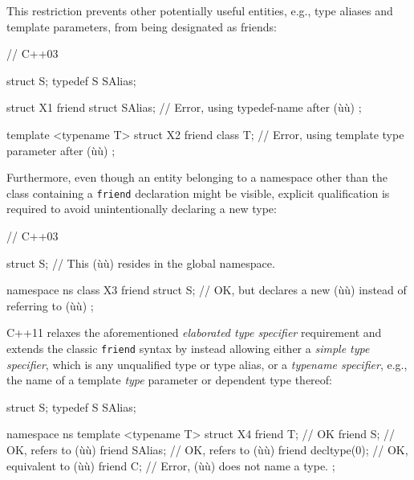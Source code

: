 \noindent This restriction prevents other potentially useful entities, e.g., type
aliases and template parameters, from being designated as friends:

\begin{emcppslisting}
// C++03

struct S;
typedef S SAlias;

struct X1
{
    friend struct SAlias;  // Error, using typedef-name after (ù{}ù)
};

template <typename T>
struct X2
{
    friend class T;        // Error, using template type parameter after (ù{}ù)
};
\end{emcppslisting}
    
\noindent Furthermore, even though an entity belonging to a namespace other than
the class containing a \lstinline!friend! declaration might be visible,
explicit qualification is required to avoid unintentionally declaring a new type:

\begin{emcppslisting}
// C++03

struct S;  // This (ù{}ù) resides in the global namespace.

namespace ns
{
    class X3
    {
        friend struct S;
            // OK, but declares a new (ù{}ù) instead of referring to (ù{}ù)
    };
}
\end{emcppslisting}
    
\noindent C++11 relaxes the aforementioned \emph{elaborated type specifier}
requirement and extends the classic \lstinline!friend! syntax by instead
allowing either a \emph{simple type specifier}, which is any unqualified
type or type alias, or a \emph{typename specifier}, e.g., the name of a
template \emph{type} parameter or dependent type thereof:

\begin{emcppslisting}
struct S;
typedef S SAlias;

namespace ns
{
    template <typename T>
    struct X4
    {
        friend T;           // OK
        friend S;           // OK, refers to (ù{}ù)
        friend SAlias;      // OK, refers to (ù{}ù)
        friend decltype(0); // OK, equivalent to (ù{}ù)
        friend C;           // Error, (ù{}ù) does not name a type.
    };
}
\end{emcppslisting}
    
